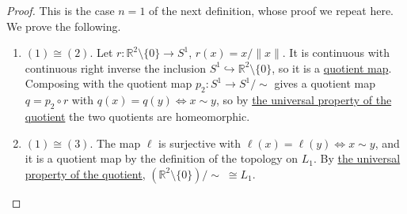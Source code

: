 	\begin{proof}
	  This is the case $n = 1$ of the next definition, whose proof we repeat here. We prove the following. 
		\begin{enumerate}
		  \item $(1) \cong (2)$. Let $r: \mathbb{R}^2 \setminus \{0\} \rightarrow S^1$, $r(x) = x / \|x\|$. It is continuous with continuous right inverse the inclusion $S^1 \hookrightarrow \mathbb{R}^2 \setminus \{0\}$, so it is a \hyperref[def:quotient-map]{quotient map}. Composing with the quotient map $p_2: S^1 \rightarrow S^1/{\sim}$ gives a quotient map $q = p_2 \circ r$ with $q(x) = q(y) \iff x \sim y$, so by \hyperref[thm:quotient_homeomorphism]{the universal property of the quotient} the two quotients are homeomorphic. 

			\item $(1) \cong (3)$. The map $\ell$ is surjective with $\ell(x) = \ell(y) \iff x \sim y$, and it is a quotient map by the definition of the topology on $L_1$. By \hyperref[thm:quotient_homeomorphism]{the universal property of the quotient}, $(\mathbb{R}^2 \setminus \{0\})/{\sim} \; \cong L_1$. 
		\end{enumerate}
	\end{proof}

